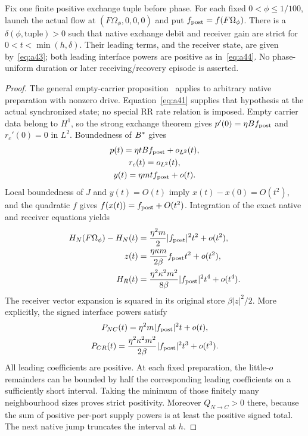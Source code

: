 \begin{theorem}\label{thm:initial}
Fix one finite positive exchange tuple before phase. For each fixed $0<\phi\le1/100$, launch the actual flow at $(F\Omega_\phi,0,0,0)$ and put $f_{\rm post}=f(F\Omega_\phi)$. There is a $\delta(\phi,\mathrm{tuple})>0$ such that native exchange debit and receiver gain are strict for $0<t<\min(h,\delta)$. Their leading terms, and the receiver state, are given by~\eqref{eq:a43}; both leading interface powers are positive as in~\eqref{eq:a44}. No phase-uniform duration or later receiving/recovery episode is asserted.
\end{theorem}
\begin{proof}
The general empty-carrier proposition~\cite[Proposition 4.1]{rx} applies to arbitrary native preparation with nonzero drive. Equation~\eqref{eq:a41} supplies that hypothesis at the actual synchronized state; no special RR rate relation is imposed. Empty carrier data belong to $H^1$, so the strong exchange theorem gives $p'(0)=\eta B f_{\rm post}$ and $r_c'(0)=0$ in $L^2$. Boundedness of $B^*$ gives
\begin{equation}\label{eq:a42}%
\begin{gathered}
p(t)=\eta tBf_{\rm post}+o_{L^2}(t),\\ r_c(t)=o_{L^2}(t),\\ y(t)=\eta mtf_{\rm post}+o(t).
\end{gathered}
\end{equation}
Local boundedness of $J$ and $y(t)=O(t)$ imply $x(t)-x(0)=O(t^2)$, and the quadratic $f$ gives $f(x(t))=f_{\rm post}+O(t^2)$. Integration of the exact native and receiver equations yields
\begin{equation}\label{eq:a43}%
\begin{aligned}
H_N(F\Omega_\phi)-H_N(t)&=\frac{\eta^2m}{2}|f_{\rm post}|^2t^2+o(t^2),\\
z(t)&=\frac{\eta\kappa m}{2\beta}f_{\rm post}t^2+o(t^2),\\
H_R(t)&=\frac{\eta^2\kappa^2m^2}{8\beta}|f_{\rm post}|^2t^4+o(t^4).
\end{aligned}
\end{equation}
The receiver vector expansion is squared in its original store $\beta|z|^2/2$. More explicitly, the signed interface powers satisfy
\begin{equation}\label{eq:a44}%
\begin{gathered}
P_{NC}(t)=\eta^2m|f_{\rm post}|^2t+o(t),\\ P_{CR}(t)=\frac{\eta^2\kappa^2m^2}{2\beta}|f_{\rm post}|^2t^3+o(t^3).
\end{gathered}
\end{equation}
All leading coefficients are positive. At each fixed preparation, the little-$o$ remainders can be bounded by half the corresponding leading coefficients on a sufficiently short interval. Taking the minimum of those finitely many neighbourhood sizes proves strict positivity. Moreover $Q_{N\to C}>0$ there, because the sum of positive per-port supply powers is at least the positive signed total. The next native jump truncates the interval at $h$.
\end{proof}
